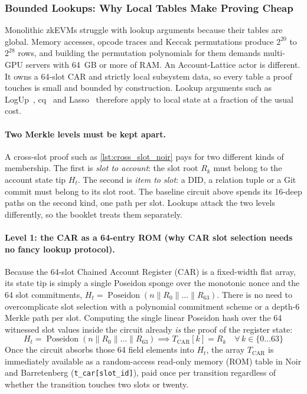 \documentclass[a4paper,11pt,twoside,parskip=half-,headings=small]{scrartcl}
\newcommand{\code}[1]{\texttt{#1}}
\begin{document}
\subsubsection{Bounded Lookups: Why Local Tables Make Proving Cheap}
\label{sec:account_lattice_lookups}

Monolithic zkEVMs struggle with lookup arguments because their tables are global. Memory accesses, opcode traces and Keccak permutations produce $2^{20}$ to $2^{28}$ rows, and building the permutation polynomials for them demands multi-GPU servers with 64~GB or more of RAM. An Account-Lattice actor is different. It owns a 64-slot CAR and strictly local subsystem data, so every table a proof touches is small and bounded by construction. Lookup arguments such as LogUp~\cite{habock2022logup}, cq~\cite{eagen2023cq} and Lasso~\cite{setty2023lasso} therefore apply to local state at a fraction of the usual cost.

\paragraph{Two Merkle levels must be kept apart.}
A cross-slot proof such as \cref{lst:cross_slot_noir} pays for two different kinds of membership. The first is \emph{slot to account}: the slot root $R_k$ must belong to the account state tip $H_t$. The second is \emph{item to slot}: a DID, a relation tuple or a Git commit must belong to its slot root. The baseline circuit above spends its 16-deep paths on the second kind, one path per slot. Lookups attack the two levels differently, so the booklet treats them separately.

\paragraph{Level 1: the CAR as a 64-entry ROM (why CAR slot selection needs no fancy lookup protocol).}
Because the 64-slot Chained Account Register (CAR) is a fixed-width flat array, its state tip is simply a single Poseidon sponge over the monotonic nonce and the 64 slot commitments, $H_t = \operatorname{Poseidon}(n \parallel R_0 \parallel \dots \parallel R_{63})$. There is no need to overcomplicate slot selection with a polynomial commitment scheme or a depth-6 Merkle path per slot. Computing the single linear Poseidon hash over the 64 witnessed slot values inside the circuit already \emph{is} the proof of the register state:
\begin{equation}
  H_t = \operatorname{Poseidon}(n \parallel R_0 \parallel \dots \parallel R_{63}) \implies T_{\text{CAR}}[k] = R_k \quad \forall\, k \in \{0 \dots 63\}
\end{equation}
Once the circuit absorbs those 64 field elements into $H_t$, the array $T_{\text{CAR}}$ is immediately available as a random-access read-only memory (ROM) table in Noir and Barretenberg (\code{t\_car[slot\_id]}), paid once per transition regardless of whether the transition touches two slots or twenty.
\end{document}
